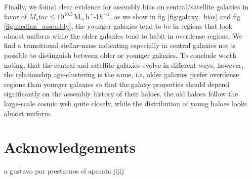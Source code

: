 \documentclass[fleqn,usenatbib]{mnras}
\newcommand{\Msunh}{\,{\rm M}$_{\odot}$\,\ifmmode h^{-1}\else $h^{-1}$\fi}
\begin{document}
Finally, we found clear evidence for assembly bias on
central/satellite galaxies in favor of $M_star \leq 10^{10.5}$\Msunh,
as we show in fig \ref{fig:galaxy_bias} and fig
\ref{fig:median_assembly}, the younger galaxies tend to be in regions
that look almost uniform while the older galaxies tend to habit in
overdense regions. We find a transitional stellar-mass indicating
especially in central galaxies not is possible to distinguish between
older or younger galaxies.  
To conclude worth noting, that the central and satellite galaxies
evolve in different ways, however, the relationship age-clustering is
the same, i.e, older galaxies prefer overdense regions than younger
galaxies so that the galaxy properties should depend significantly on
the assembly history of their haloes, the old haloes follow the
large-scale cosmic web quite closely, while the distribution of young
haloes looks almost uniform. 







\section*{Acknowledgements}

a gustavo por prestarnos el aparato jijij






\bsp	%
\label{lastpage}
\end{document}
